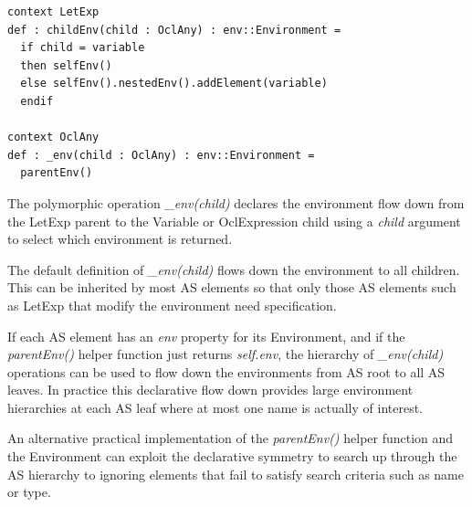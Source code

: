 \documentclass{llncs}
\begin{document}


\begin{lstlisting}[caption=Name resolution producers, label=lst:exampleNameResodesc, language=OCL]
context LetExp
def : childEnv(child : OclAny) : env::Environment =
  if child = variable
  then selfEnv()
  else selfEnv().nestedEnv().addElement(variable)
  endif
  
context OclAny
def : _env(child : OclAny) : env::Environment =
  parentEnv()	
\end{lstlisting}

The polymorphic operation \emph{\_env(child)} declares the environment flow down from the LetExp parent to the Variable or OclExpression child using a \emph{child} argument to select which environment is returned.

The default definition of \emph{\_env(child)} flows down the environment to all children. This can be inherited by most AS elements so that only those AS elements such as LetExp that modify the environment need specification.

If each AS element has an \emph{env} property for its Environment, and if the \emph{parentEnv()} helper function just returns \emph{self.env}, the hierarchy of \emph{\_env(child)} operations can be used to flow down the environments from AS root to all AS leaves. In practice this declarative flow down provides large environment hierarchies at each AS leaf where at most one name is actually of interest.

An alternative practical implementation of  the \emph{parentEnv()} helper function and the Environment can exploit the declarative symmetry to search up through the AS hierarchy to ignoring elements that fail to satisfy search criteria such as name or type.
\end{document}
